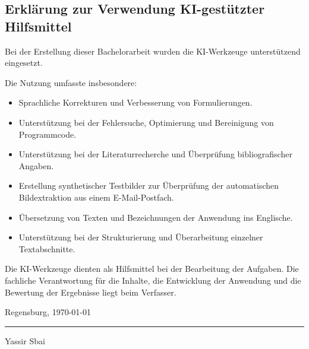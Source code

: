 \documentclass[12pt,a4paper]{report}
\begin{document}
\begin{singlespace}

\section*{Erklärung zur Verwendung KI-gestützter Hilfsmittel}

Bei der Erstellung dieser Bachelorarbeit wurden
die KI-Werkzeuge unterstützend eingesetzt.

Die Nutzung umfasste insbesondere:

\begin{itemize}
    \item Sprachliche Korrekturen und Verbesserung
    von Formulierungen.

    \item Unterstützung bei der Fehlersuche,
    Optimierung und Bereinigung von Programmcode.

    \item Unterstützung bei der Literaturrecherche
    und Überprüfung bibliografischer Angaben.

    \item Erstellung synthetischer Testbilder
    zur Überprüfung der automatischen
    Bildextraktion aus einem E-Mail-Postfach.


    \item Übersetzung von Texten und Bezeichnungen
    der Anwendung ins Englische.

    \item Unterstützung bei der Strukturierung
    und Überarbeitung einzelner Textabschnitte.
\end{itemize}

Die KI-Werkzeuge dienten als Hilfsmittel bei der
Bearbeitung der Aufgaben. Die fachliche
Verantwortung für die Inhalte, die Entwicklung
der Anwendung und die Bewertung der Ergebnisse
liegt beim Verfasser.

\vspace{2cm}

Regensburg, \today

\vspace{1.5cm}

\rule{7cm}{0.4pt}

Yassir Sbai

\end{singlespace}
\end{document}
